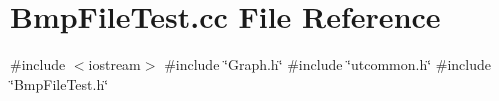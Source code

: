 \section{Bmp\+File\+Test.\+cc File Reference}
\label{BmpFileTest_8cc}
{\ttfamily \#include $<$iostream$>$}\newline
{\ttfamily \#include \char`\"{}Graph.\+h\char`\"{}}\newline
{\ttfamily \#include \char`\"{}utcommon.\+h\char`\"{}}\newline
{\ttfamily \#include \char`\"{}Bmp\+File\+Test.\+h\char`\"{}}\newline
